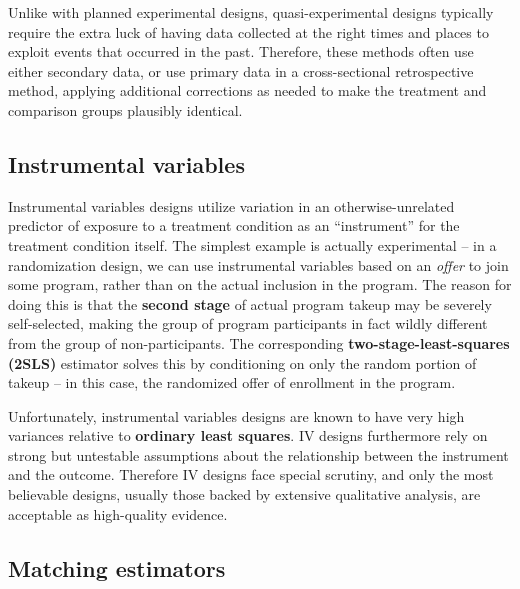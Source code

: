 Unlike with planned experimental designs,
quasi-experimental designs typically require the extra luck
of having data collected at the right times and places
to exploit events that occurred in the past.
Therefore, these methods often use either secondary data,
or use primary data in a cross-sectional retrospective method,
applying additional corrections as needed to make
the treatment and comparison groups plausibly identical.

\subsection{Instrumental variables}

Instrumental variables designs utilize variation in an
otherwise-unrelated predictor of exposure to a treatment condition
as an ``instrument'' for the treatment condition itself.
The simplest example is actually experimental --
in a randomization design, we can use instrumental variables
based on an \textit{offer} to join some program,
rather than on the actual inclusion in the program.\cite{angrist2001instrumental}
The reason for doing this is that the \textbf{second stage}
of actual program takeup may be severely self-selected,
making the group of program participants in fact
wildly different from the group of non-participants.
The corresponding \textbf{two-stage-least-squares (2SLS)} estimator
solves this by conditioning on only the random portion of takeup --
in this case, the randomized offer of enrollment in the program.

Unfortunately, instrumental variables designs are known
to have very high variances relative to \textbf{ordinary least squares}.\cite{young2017consistency}
IV designs furthermore rely on strong but untestable assumptions
about the relationship between the instrument and the outcome.\cite{bound1995problems}
Therefore IV designs face special scrutiny,
and only the most believable designs,
usually those backed by extensive qualitative analysis,
are acceptable as high-quality evidence.

\subsection{Matching estimators}

